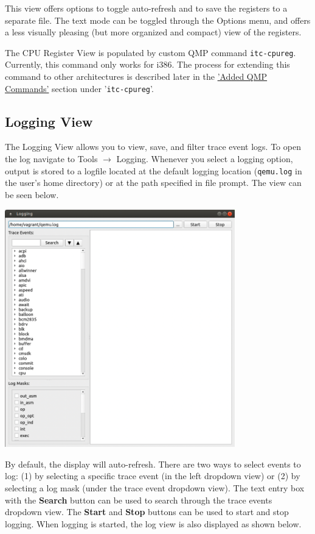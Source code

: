 \documentclass{article}
\newcommand{\code}[1]{\texttt{#1}}
\begin{document}
This view offers options to toggle auto-refresh and to save the registers to a separate file. The text mode can be toggled through the Options menu, and offers a less visually pleasing (but more organized and compact) view of the registers. \newline

The CPU Register View is populated by custom QMP command \code{itc-cpureg}. Currently, this command only works for i386. The process for extending this command to other architectures is described later in the \hyperref[sec:itccpureg]{'Added QMP Commands'} section under '\code{itc-cpureg}'.

\subsection{Logging View}
The Logging View allows you to view, save, and filter trace event logs. To open the log navigate to Tools $\rightarrow$ Logging. Whenever you select a logging option, output is stored to a logfile located at the default logging location (\code{qemu.log} in the user's home directory) or at the path specified in file prompt. The view can be seen below.
\begin{center}
    \includegraphics[width=100mm]{images/logging-view.png}
\end{center}
By default, the display will auto-refresh. There are two ways to select events to log: (1) by selecting a specific trace event (in the left dropdown view) or (2) by selecting a log mask (under the trace event dropdown view). The text entry box with the \textbf{Search} button can be used to search through the trace events dropdown view. The \textbf{Start} and \textbf{Stop} buttons can be used to start and stop logging. When logging is started, the log view is also displayed as shown below.
\end{document}
